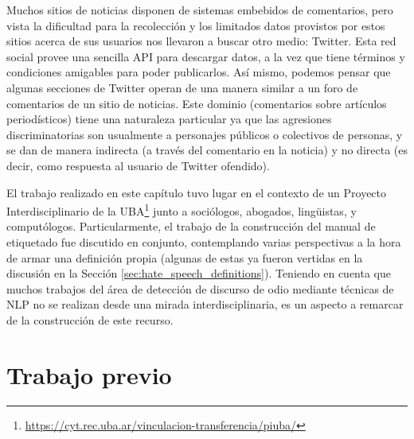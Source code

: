 Muchos sitios de noticias disponen de sistemas embebidos de comentarios, pero vista la dificultad para la recolección y los limitados datos provistos por estos sitios acerca de sus usuarios nos llevaron a buscar otro medio: Twitter. Esta red social provee una sencilla API para descargar datos, a la vez que tiene términos y condiciones amigables para poder publicarlos. Así mismo, podemos pensar que algunas secciones de Twitter operan de una manera similar a un foro de comentarios de un sitio de noticias. Este dominio (comentarios sobre artículos periodísticos) tiene una naturaleza particular ya que las agresiones discriminatorias son usualmente a personajes públicos o colectivos de personas, y se dan de manera indirecta (a través del comentario en la noticia) y no directa (es decir, como respuesta al usuario de Twitter ofendido).

El trabajo realizado en este capítulo tuvo lugar en el contexto de un Proyecto Interdisciplinario de la UBA\footnote{\url{https://cyt.rec.uba.ar/vinculacion-transferencia/piuba/}} junto a sociólogos, abogados, lingüistas, y computólogos. Particularmente, el trabajo de la construcción del manual de etiquetado fue discutido en conjunto, contemplando varias perspectivas a la hora de armar una definición propia (algunas de estas ya fueron vertidas en la discusión en la Sección \ref{sec:hate_speech_definitions}). Teniendo en cuenta que muchos trabajos del área de detección de discurso de odio mediante técnicas de NLP no se realizan desde una mirada interdisciplinaria, es un aspecto a remarcar de la construcción de este recurso.

\section{Trabajo previo}
\label{sec:dataset_previous}

